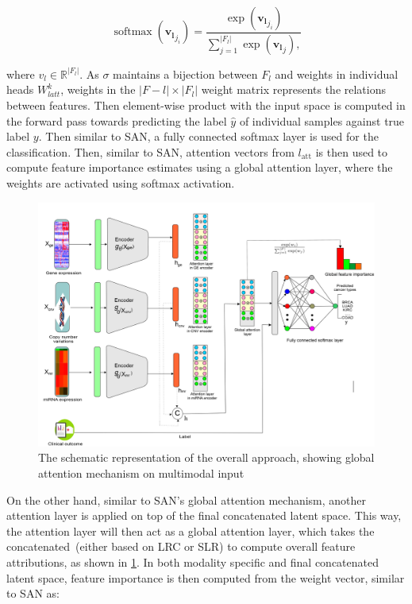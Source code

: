 \begin{equation}
    \operatorname{softmax}\left(\boldsymbol{v_l}_{j_{i}}\right)=\frac{\exp \left(\boldsymbol{v_l}_{j_{i}}\right)}{\sum_{j=1}^{|F_l|} \exp \left(\boldsymbol{v_l}_{j}\right),}
\end{equation}

\hspace*{3.5mm} where $v_l \in \mathbb{R}^{|F_l|}$. As $\sigma$ maintains a bijection between $F_l$ and weights in individual heads $W_{latt}^{k}$, weights in the $|F-l| \times|F_l|$ weight matrix represents the relations between features. Then element-wise product with the input space is computed in the forward pass towards predicting the label $\hat{y}$ of individual samples against true label ${y}$. Then similar to SAN, a fully connected softmax layer is used for the classification. Then, similar to SAN, attention vectors from $l_{\text {att}}$ is then used to compute feature importance estimates using a global attention layer, where the weights are activated using softmax activation. 

\begin{figure}
	\centering
	\includegraphics[scale=0.8]{images/full_attention.png}
	\caption{The schematic representation of the overall approach, showing global attention mechanism on multimodal input}
	\label{fig:all_attention}
\end{figure}

\hspace*{3.5mm} On the other hand, similar to SAN's global attention mechanism, another attention layer is applied on top of the final concatenated latent space. This way, the attention layer will then act as a global attention layer, which takes the concatenated~(either based on LRC or SLR) to compute overall feature attributions, as shown in \cref{fig:all_attention}. In both modality specific and final concatenated latent space, feature importance is then computed from the weight vector, similar to SAN as:

